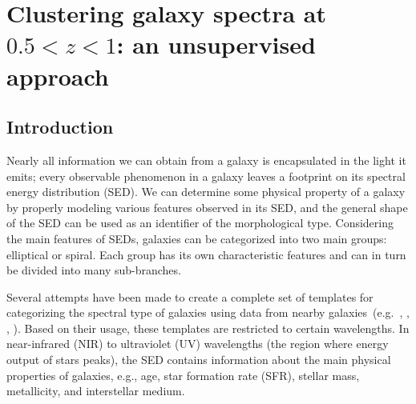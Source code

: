 \chapter[Classifying High-Redshift Galaxy Spectra]{Clustering galaxy spectra at $0.5<z<1$: an unsupervised approach}
\label{ch: paper2}

\section{Introduction}
\label{sec: intro_somz}
Nearly all information we can obtain from a galaxy is encapsulated in the light it emits; every observable phenomenon in a galaxy leaves a footprint on its spectral energy distribution (SED).
We can determine some physical property of a galaxy by properly modeling various features observed in its SED, and the general shape of the SED can be used as an identifier of the morphological type.
Considering the main features of SEDs, galaxies can be categorized into two main groups: elliptical or spiral. %
Each group has its own characteristic features and can in turn be divided into many sub-branches.

Several attempts have been made to create a complete set of templates for categorizing the spectral type of galaxies using data from nearby galaxies~(e.g.~\citealt{Kinney93}, \citealt[][hereafter ]{Kinney96}, \citealt{Bershady00}, \citealt{Mannucci01}). 
Based on their usage, these templates are restricted to certain wavelengths.
In near-infrared (NIR) to ultraviolet (UV) wavelengths (the region where energy output of stars peaks), the SED contains information about the main physical properties of galaxies, e.g., age, star formation rate (SFR), stellar mass, metallicity, and interstellar medium.



